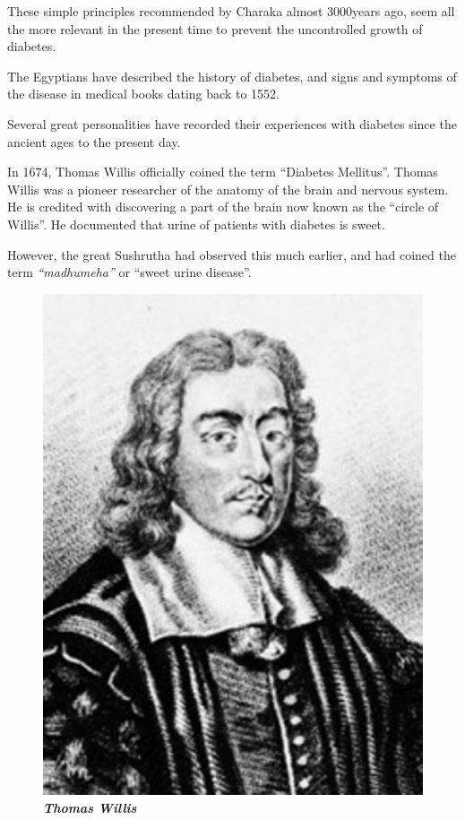 These simple principles recommended by Charaka almost 3000\break years ago, seem all the more relevant in the present time to prevent the uncontrolled growth of diabetes.

The Egyptians have described the history of diabetes, and signs and symptoms of the disease in medical books dating back to 1552.

Several great personalities have recorded their experiences with diabetes since the ancient ages to the present day.

In 1674, Thomas Willis officially coined the term “Diabetes Melli\-tus”. Thomas Willis was a pioneer researcher of the anatomy of the brain and nervous system. He is credited with discovering a part of the brain now known as the “circle of Willis”. He documented that urine of patients with diabetes is sweet.

However, the great Sushrutha had observed this much earlier, and had coined the term \textit{“madhumeha”} or “sweet urine disease”.

\begin{figure}
\centering
\includegraphics[scale=.9]{images/007.jpg}\\
\textbf{\textit{Thomas Willis}}
\end{figure}


